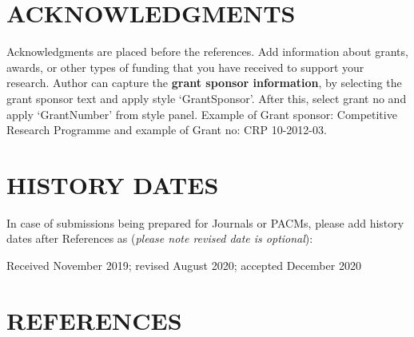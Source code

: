 \documentclass[conference]{IEEEtran}
\begin{document}
\section{ACKNOWLEDGMENTS}

Acknowledgments are placed before the references. Add information about grants, awards, or other types of funding that you have received to support your research. Author can capture the \textbf{grant sponsor information}, by selecting the grant sponsor text and apply style ‘GrantSponsor’. After this, select grant no and apply ‘GrantNumber’ from style panel. Example of Grant sponsor: Competitive Research Programme and example of Grant no: CRP 10-2012-03.

\section{HISTORY DATES}

In case of submissions being prepared for Journals or PACMs, please add history dates after References as (\textit{please note revised date is optional}):

Received November 2019; revised August 2020; accepted December 2020

\section{REFERENCES}
\end{document}
